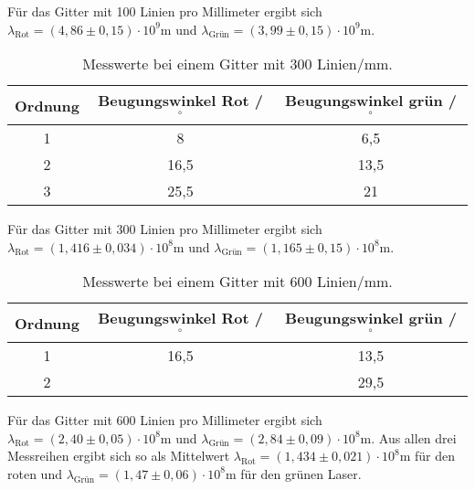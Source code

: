 \noindent
Für das Gitter mit 100 Linien pro Millimeter ergibt sich $\lambda_\text{Rot} = (4,86 \pm 0,15) \cdot 10^9 \si{\meter}$ und
$\lambda_\text{Grün} = (3,99 \pm 0,15) \cdot 10^9 \si{\meter}$.

\begin{table}[H]
  \centering
  \caption{Messwerte bei einem Gitter mit 300 Linien/mm.}
  \label{tab:git300}
  \begin{tabular}{c c c}
    \toprule
    Ordnung & Beugungswinkel Rot / $^{\circ}$ & Beugungswinkel grün / $^{\circ}$\\
    \midrule
    1 & 8 & 6,5\\
    2 & 16,5 & 13,5\\
    3 & 25,5 & 21\\
    \bottomrule
  \end{tabular}
\end{table}

\noindent
Für das Gitter mit 300 Linien pro Millimeter ergibt sich $\lambda_\text{Rot} = (1,416 \pm 0,034) \cdot 10^8 \si{\meter}$ und
$\lambda_\text{Grün} = (1,165 \pm 0,15) \cdot 10^8 \si{\meter}$.

\begin{table}[H]
  \centering
  \caption{Messwerte bei einem Gitter mit 600 Linien/mm.}
  \label{tab:git600}
  \begin{tabular}{c c c}
    \toprule
    Ordnung & Beugungswinkel Rot / $^{\circ}$ & Beugungswinkel grün / $^{\circ}$\\
    \midrule
    1 & 16,5 & 13,5\\
    2 & & 29,5\\
    \bottomrule
  \end{tabular}
\end{table}

\noindent
Für das Gitter mit 600 Linien pro Millimeter ergibt sich $\lambda_\text{Rot} = (2,40 \pm 0,05) \cdot 10^8 \si{\meter}$ und
$\lambda_\text{Grün} = (2,84 \pm 0,09) \cdot 10^8 \si{\meter}$.
\newline \newline
Aus allen drei Messreihen ergibt sich so als Mittelwert $\lambda_\text{Rot} = (1,434 \pm 0,021) \cdot 10^8 \si{\meter}$ für den roten und
$\lambda_\text{Grün} = (1,47 \pm 0,06) \cdot 10^8 \si{\meter}$ für den grünen Laser.